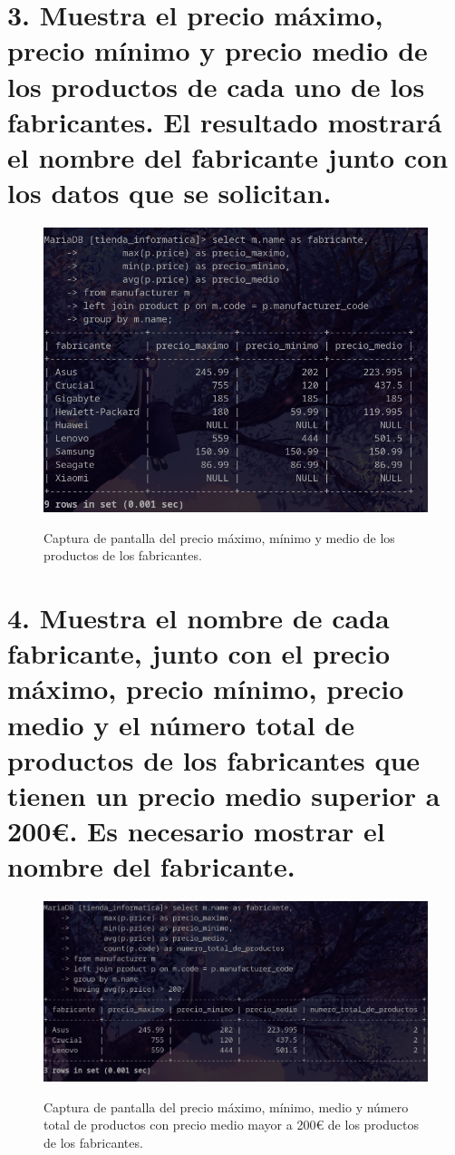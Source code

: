 \documentclass{article}
\begin{document}
\newpage %

\section*{3. Muestra el precio máximo, precio mínimo y precio medio de los productos de cada uno de los fabricantes. 
El resultado mostrará el nombre del fabricante junto con los datos que se solicitan.}

\begin{figure}[ht]
    \centering
    {
        \includegraphics[width=\linewidth]{03screenshot.png} %
    }
    \caption{Captura de pantalla del precio máximo, mínimo y medio de los productos de los fabricantes.}
\end{figure}
\newpage %

\section*{4. Muestra el nombre de cada fabricante, junto con el precio máximo, 
precio mínimo, precio medio y el número total de productos de los fabricantes 
que tienen un precio medio superior a 200€. Es necesario mostrar el nombre del fabricante.}

\begin{figure}[ht]
    \centering
    {
        \includegraphics[width=\linewidth]{04screenshot.png} %
    }
    \caption{Captura de pantalla del precio máximo, mínimo, medio y número total de productos con precio medio mayor a 200€
     de los productos de los fabricantes.}
\end{figure}
\end{document}
